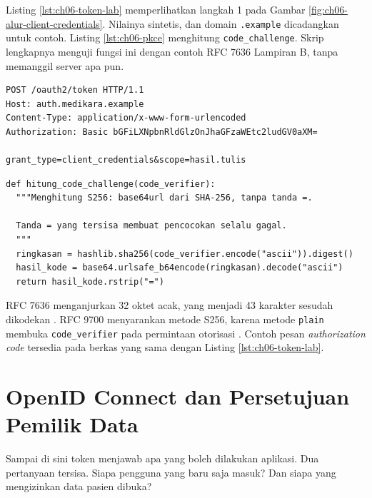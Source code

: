 \begin{pendalaman}[title={Pendalaman Teknis (opsional): Isi Pesan dan Perhitungan PKCE}]
Listing \ref{lst:ch06-token-lab} memperlihatkan langkah 1 pada Gambar \ref{fig:ch06-alur-client-credentials}. Nilainya
sintetis, dan domain \texttt{.example} dicadangkan untuk contoh. Listing \ref{lst:ch06-pkce} menghitung
\texttt{code\_challenge}. Skrip lengkapnya menguji fungsi ini dengan contoh RFC 7636 Lampiran B, tanpa memanggil server
apa pun.

\begin{lstlisting}[language=http, caption={Laboratorium meminta token, tersedia di \berkas{sources/chapter06/contoh-pesan-oauth.md}}, label={lst:ch06-token-lab}]
POST /oauth2/token HTTP/1.1
Host: auth.medikara.example
Content-Type: application/x-www-form-urlencoded
Authorization: Basic bGFiLXNpbnRldGlzOnJhaGFzaWEtc2ludGV0aXM=

grant_type=client_credentials&scope=hasil.tulis
\end{lstlisting}

\begin{lstlisting}[style=ch06python, caption={Menghitung \texttt{code\_challenge} S256, tersedia di \berkas{sources/chapter06/hitung-pkce.py}}, label={lst:ch06-pkce}]
def hitung_code_challenge(code_verifier):
  """Menghitung S256: base64url dari SHA-256, tanpa tanda =.

  Tanda = yang tersisa membuat pencocokan selalu gagal.
  """
  ringkasan = hashlib.sha256(code_verifier.encode("ascii")).digest()
  hasil_kode = base64.urlsafe_b64encode(ringkasan).decode("ascii")
  return hasil_kode.rstrip("=")
\end{lstlisting}

RFC 7636 menganjurkan 32 oktet acak, yang menjadi 43 karakter sesudah dikodekan \cite{c06-rfc7636}. RFC 9700 menyarankan
metode S256, karena metode \texttt{plain} membuka \texttt{code\_verifier} pada permintaan otorisasi \cite{rfc9700}.
Contoh pesan \textit{authorization code} tersedia pada berkas yang sama dengan Listing \ref{lst:ch06-token-lab}.
\end{pendalaman}

\section{OpenID Connect dan Persetujuan Pemilik Data}

Sampai di sini token menjawab apa yang boleh dilakukan aplikasi. Dua pertanyaan tersisa. Siapa pengguna yang baru saja
masuk? Dan siapa yang mengizinkan data pasien dibuka?

